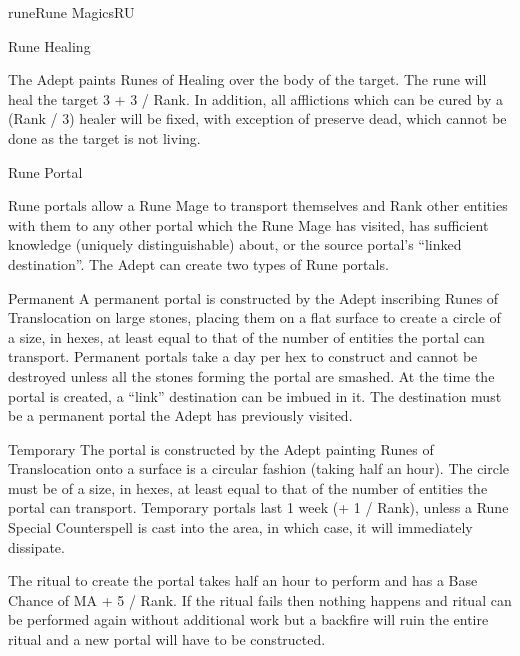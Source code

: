 \begin{College}[2.2]{rune}{Rune Magics}{RU}
\begin{ritual}[R-5]{Rune Healing}

\begin{effects}
The Adept paints Runes of Healing over the body of the target. The
rune will heal the target 3 + 3 / Rank.  In addition, all afflictions
which can be cured by a (Rank / 3) healer will be fixed, with
exception of preserve dead, which cannot be done as the target is not
living.
\end{effects}
\end{ritual}

\begin{ritual}[R-6]{Rune Portal}

\begin{effects}
Rune portals allow a Rune Mage to transport themselves and Rank other
entities with them to any other portal which the Rune Mage has
visited, has sufficient knowledge (uniquely distinguishable) about,
or the source portal’s “linked destination”.  The Adept can create two
types of Rune portals.
\begin{Description}
\item[Permanent] A permanent portal is constructed by the Adept
  inscribing Runes of Translocation on large stones, placing them on a
  flat surface to create a circle of a size, in hexes, at least equal
  to that of the number of entities the portal can transport.
  Permanent portals take a day per hex to construct and cannot be
  destroyed unless all the stones forming the portal are smashed. At
  the time the portal is created, a “link” destination can be imbued
  in it.  The destination must be a permanent portal the Adept has
  previously visited.
\item[Temporary] The portal is constructed by the Adept painting Runes
  of Translocation onto a surface is a circular fashion (taking half
  an hour).  The circle must be of a size, in hexes, at least equal to
  that of the number of entities the portal can transport.  Temporary
  portals last 1 week (+ 1 / Rank), unless a Rune Special Counterspell
  is cast into the area, in which case, it will immediately dissipate.
\end{Description}
The ritual to create the portal takes half an hour to perform and has
a Base Chance of MA + 5 / Rank.  If the ritual fails then nothing
happens and ritual can be performed again without additional work but
a backfire will ruin the entire ritual and a new portal will have to
be constructed.


\end{effects}
\end{ritual}
\end{College}
